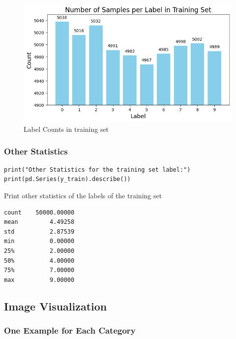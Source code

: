 \documentclass[a4paper,11pt]{article}
\begin{document}
\begin{figure}[H]
    \centering
    \includegraphics[scale=0.7]{./img/Label_counts.png}
    \caption[Label count] {Label Counts in training set}
\end{figure}

\subsubsection{Other Statistics}

\begin{listing}[!ht]
\begin{verbatim}
print("Other Statistics for the training set label:")
print(pd.Series(y_train).describe())
\end{verbatim}
\caption{Print other statistics of the labels of the training set}
\label{listing:python}
\end{listing}

\begin{verbatim}
count    50000.00000
mean         4.49258
std          2.87539
min          0.00000
25%          2.00000
50%          4.00000
75%          7.00000
max          9.00000
\end{verbatim}

\subsection{Image Visualization}
\subsubsection{One Example for Each Category}
\end{document}
